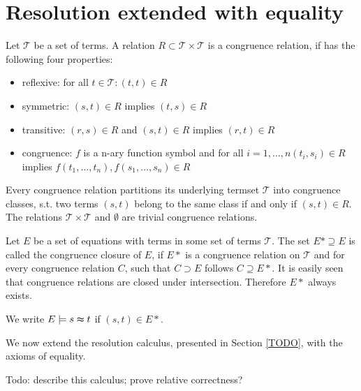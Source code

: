 \section*{Resolution extended with equality}

Let $\mathcal{T}$ be a set of terms.
A relation $R \subset \mathcal{T} \times \mathcal{T}$ is a congruence relation, if has the following four properties:
\begin{itemize}
	\item reflexive: for all $t \in \mathcal{T}: (t,t) \in R$
	\item symmetric: $(s,t) \in R$ implies $(t,s) \in R$
	\item transitive: $(r,s) \in R$ and $(s,t) \in R$ implies $(r,t) \in R$
	\item congruence: $f$ is a n-ary function symbol and for all $i = 1,\ldots,n (t_i,s_i) \in R$ implies $f(t_1,\ldots,t_n),f(s_1,\ldots,s_n) \in R$
\end{itemize}

Every congruence relation partitions its underlying termset $\mathcal{T}$ into congruence classes, s.t. two terms $(s,t)$ belong to the same class if and only if $(s,t) \in R$.
The relations $\mathcal{T} \times \mathcal{T}$ and $\emptyset$ are trivial congruence relations.

Let $E$ be a set of equations with terms in some set of terms $\mathcal{T}$.
The set $E* \supseteq E$ is called the congruence closure of $E$, 
if $E*$ is a congruence relation on $\mathcal{T}$ and for every congruence relation $C$, such that $C \supset E$ follows $C \supseteq E*$.
It is easily seen that congruence relations are closed under intersection.
Therefore $E*$ always exists.

We write $E \models s \thickapprox t$ if $(s,t) \in E*$.

We now extend the resolution calculus, presented in Section \ref{TODO}, with the axioms of equality.

{\color{blue} Todo: describe this calculus; prove relative correctness?}